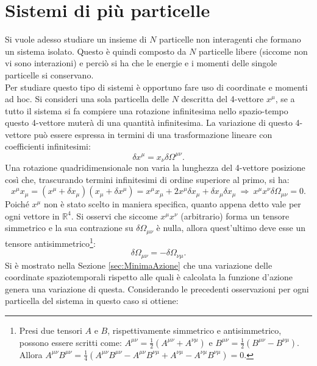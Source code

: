 \section{Sistemi di più particelle}
Si vuole adesso studiare un insieme di $N$ particelle non interagenti che formano un sistema isolato.
Questo è quindi composto da $N$ particelle libere (siccome non vi sono interazioni) e perciò si ha che le energie e i momenti delle singole particelle si conservano.\\

Per studiare questo tipo di sistemi è opportuno fare uso di coordinate e momenti ad hoc. Si consideri una sola particella delle $N$ descritta del 4-vettore $x^\mu$, se a tutto il sistema si fa compiere una rotazione infinitesima nello spazio-tempo questo 4-vettore muterà di una quantità infinitesima. La variazione di questo 4-vettore può essere espressa in termini di una trasformazione lineare con coefficienti infinitesimi:
\begin{equation*}
    \delta x^\mu=x_\nu\delta \Omega^{\mu\nu}.
\end{equation*}
Una rotazione quadridimensionale non varia la lunghezza del 4-vettore posizione così che, trascurando termini infinitesimi di ordine superiore al primo, si ha: 
\begin{equation*}
    x^\mu x_\mu=(x^\mu+\delta x_\mu)(x_\mu+\delta x^\mu)= x^\mu x_\mu+2x^\mu \delta x_\mu+ \delta x_\mu\delta x_\mu\ \Rightarrow \ x^\mu x^\nu \delta \Omega_{\mu \nu}=0.
\end{equation*}
Poiché $x^\mu$ non è stato scelto in maniera specifica, quanto appena detto vale per ogni vettore in $\mathbb{R}^4$. Si osservi che siccome $x^\mu x^\nu$ (arbitrario) forma un tensore simmetrico e la sua contrazione su $\delta \Omega_{\mu \nu}$ è nulla, allora quest'ultimo deve esse un tensore antisimmetrico\footnote{Presi due tensori $A$ e $B$, rispettivamente simmetrico e antisimmetrico, possono essere scritti come: $A^{\mu\nu}=\frac{1}{2}(A^{\mu\nu}+A^{\nu\mu})$ e $B^{\mu\nu}=\frac{1}{2}(B^{\mu\nu}-B^{\nu\mu})$. Allora $A^{\mu\nu}B^{\mu\nu}=\frac{1}{4}(A^{\mu\nu}B^{\mu\nu}-A^{\mu\nu}B^{\nu\mu}+A^{\nu\mu}-A^{\nu\mu}B^{\nu\mu})=0$.}:
\begin{equation}
    \delta\Omega_{\mu \nu}=-\delta\Omega_{\nu \mu}.
\end{equation}
Si è mostrato nella Sezione \ref{sec:MinimaAzione} che una variazione delle coordinate spaziotemporali rispetto alle quali è calcolata la funzione d'azione genera una variazione di questa. Considerando le precedenti osservazioni per ogni particella del sistema in questo caso si ottiene:
